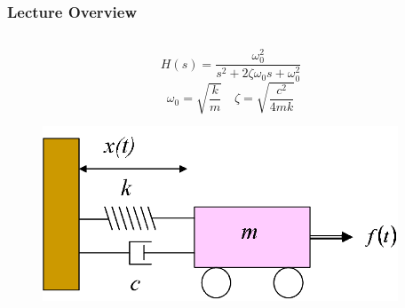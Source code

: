 \documentclass[aspectratio=169,handout]{beamer}
\begin{document}
\begin{frame}
	\frametitle{Lecture Overview}
	\begin{columns}
		\begin{column}{0.25\textwidth}
			\[
				H(s)
				= \frac{
					\omega_0^2
				}{
					s^2 + 2 \zeta \omega_0 s + \omega_0^2
				}
			\]
			\[
				\omega_0 = \sqrt{\frac{k}{m}}
				\quad
				\zeta = \sqrt{\frac{c^2}{4 m k}}
			\]
			\begin{figure}[]
				\includegraphics[width=\textwidth]{Images/SpringMassDamper_cartSystem.png}
			\end{figure}
		\end{column}
	\end{columns}
\end{frame}

% 	
% 	
\end{document}
